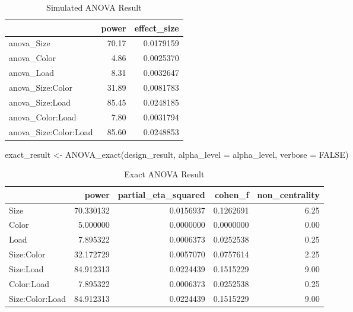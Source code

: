 \documentclass[
]{book}
\newenvironment{Shaded}{\begin{snugshade}}{\end{snugshade}}
\newcommand{\AttributeTok}[1]{\textcolor[rgb]{0.77,0.63,0.00}{#1}}
\newcommand{\ConstantTok}[1]{\textcolor[rgb]{0.00,0.00,0.00}{#1}}
\newcommand{\FunctionTok}[1]{\textcolor[rgb]{0.00,0.00,0.00}{#1}}
\newcommand{\NormalTok}[1]{#1}
\newcommand{\OtherTok}[1]{\textcolor[rgb]{0.56,0.35,0.01}{#1}}
\begin{document}
\begin{table}[!h]

\caption{\label{tab:unnamed-chunk-172}Simulated ANOVA Result}
\centering
\begin{tabular}[t]{l|r|r}
\hline
  & power & effect\_size\\
\hline
anova\_Size & 70.17 & 0.0179159\\
\hline
anova\_Color & 4.86 & 0.0025370\\
\hline
anova\_Load & 8.31 & 0.0032647\\
\hline
anova\_Size:Color & 31.89 & 0.0081783\\
\hline
anova\_Size:Load & 85.45 & 0.0248185\\
\hline
anova\_Color:Load & 7.80 & 0.0031794\\
\hline
anova\_Size:Color:Load & 85.60 & 0.0248853\\
\hline
\end{tabular}
\end{table}

\begin{Shaded}
\begin{Highlighting}[]
\NormalTok{exact\_result }\OtherTok{\textless{}{-}} \FunctionTok{ANOVA\_exact}\NormalTok{(design\_result,}
                            \AttributeTok{alpha\_level =}\NormalTok{ alpha\_level,}
                            \AttributeTok{verbose =} \ConstantTok{FALSE}\NormalTok{)}
\end{Highlighting}
\end{Shaded}

\begin{table}[!h]

\caption{\label{tab:unnamed-chunk-174}Exact ANOVA Result}
\centering
\begin{tabular}[t]{l|r|r|r|r}
\hline
  & power & partial\_eta\_squared & cohen\_f & non\_centrality\\
\hline
Size & 70.330132 & 0.0156937 & 0.1262691 & 6.25\\
\hline
Color & 5.000000 & 0.0000000 & 0.0000000 & 0.00\\
\hline
Load & 7.895322 & 0.0006373 & 0.0252538 & 0.25\\
\hline
Size:Color & 32.172729 & 0.0057070 & 0.0757614 & 2.25\\
\hline
Size:Load & 84.912313 & 0.0224439 & 0.1515229 & 9.00\\
\hline
Color:Load & 7.895322 & 0.0006373 & 0.0252538 & 0.25\\
\hline
Size:Color:Load & 84.912313 & 0.0224439 & 0.1515229 & 9.00\\
\hline
\end{tabular}
\end{table}
\end{document}
